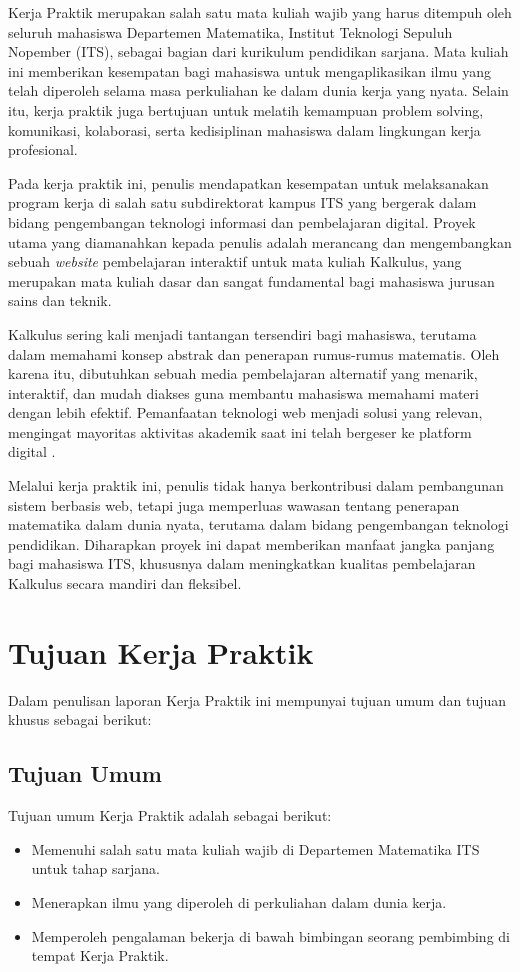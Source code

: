 \documentclass{file/KP-ITS}
\theoremstyle{definition}
\theoremstyle{definition}
\theoremstyle{plain}
\begin{document}
Kerja Praktik merupakan salah satu mata kuliah wajib yang harus ditempuh oleh seluruh mahasiswa Departemen Matematika, Institut Teknologi Sepuluh Nopember (ITS), sebagai bagian dari kurikulum pendidikan sarjana. Mata kuliah ini memberikan kesempatan bagi mahasiswa untuk mengaplikasikan ilmu yang telah diperoleh selama masa perkuliahan ke dalam dunia kerja yang nyata. Selain itu, kerja praktik juga bertujuan untuk melatih kemampuan problem solving, komunikasi, kolaborasi, serta kedisiplinan mahasiswa dalam lingkungan kerja profesional.

Pada kerja praktik ini, penulis mendapatkan kesempatan untuk melaksanakan program kerja di salah satu subdirektorat kampus ITS yang bergerak dalam bidang pengembangan teknologi informasi dan pembelajaran digital. Proyek utama yang diamanahkan kepada penulis adalah merancang dan mengembangkan sebuah \textit{website} pembelajaran interaktif untuk mata kuliah Kalkulus, yang merupakan mata kuliah dasar dan sangat fundamental bagi mahasiswa jurusan sains dan teknik.

Kalkulus sering kali menjadi tantangan tersendiri bagi mahasiswa, terutama dalam memahami konsep abstrak dan penerapan rumus-rumus matematis. Oleh karena itu, dibutuhkan sebuah media pembelajaran alternatif yang menarik, interaktif, dan mudah diakses guna membantu mahasiswa memahami materi dengan lebih efektif. Pemanfaatan teknologi web menjadi solusi yang relevan, mengingat mayoritas aktivitas akademik saat ini telah bergeser ke platform digital \cite{mustafidah2010,rahmawati2018}.

Melalui kerja praktik ini, penulis tidak hanya berkontribusi dalam pembangunan sistem berbasis web, tetapi juga memperluas wawasan tentang penerapan matematika dalam dunia nyata, terutama dalam bidang pengembangan teknologi pendidikan. Diharapkan proyek ini dapat memberikan manfaat jangka panjang bagi mahasiswa ITS, khususnya dalam meningkatkan kualitas pembelajaran Kalkulus secara mandiri dan fleksibel.

\section{Tujuan Kerja Praktik}
Dalam penulisan laporan Kerja Praktik ini mempunyai tujuan umum dan tujuan khusus sebagai berikut:
\subsection{Tujuan Umum}
Tujuan umum Kerja Praktik adalah sebagai berikut:
\begin{itemize}
  \item Memenuhi salah satu mata kuliah wajib di Departemen Matematika ITS untuk tahap sarjana.
  \item Menerapkan ilmu yang diperoleh di perkuliahan dalam dunia kerja.
  \item Memperoleh pengalaman bekerja di bawah bimbingan seorang pembimbing di tempat Kerja Praktik.
\end{itemize}
\end{document}
